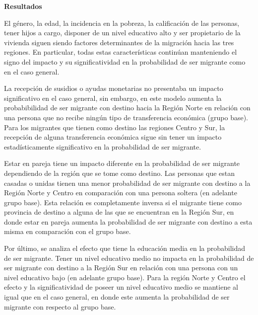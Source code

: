\documentclass[12pt,a4paper]{article}
\begin{document}
\textbf{Resultados}

El género, la edad, la incidencia en la pobreza, la calificación de las personas, tener hijos a cargo, disponer de un nivel educativo alto y ser propietario de la vivienda siguen siendo factores determinantes de la migración hacia las tres regiones. En particular, todas estas características continúan  manteniendo el signo del impacto y su significatividad en la probabilidad de ser migrante como en el caso general. 

La recepción de susidios o ayudas monetarias no presentaba un impacto significativo en el caso general, sin embargo, en este modelo aumenta la probabibilidad de ser migrante con destino hacia la Región Norte en relación con una persona que no recibe ningún tipo de transferencia económica (grupo base). Para los migrantes que tienen como destino las regiones Centro y Sur, la recepción de alguna transferencia económica  sigue sin tener un impacto estadísticamente significativo en la probabilidad de ser migrante.

Estar en pareja tiene un impacto diferente en la probabilidad de ser migrante dependiendo de la región que se tome como destino. Las personas que estan casadas o unidas tienen una menor probabilidad de ser migrante con destino a la Región Norte y Centro en comparación con una persona soltera (en adelante grupo base). Esta relación es completamente inversa si el migrante tiene como provincia de destino a alguna de las que se encuentran en la Región Sur, en donde estar en pareja aumenta la probabilidad de ser migrante con destino a esta misma en comparación con el grupo base.


Por último, se analiza el efecto que tiene la educación media en la probabilidad de ser migrante. Tener un nivel educativo medio no impacta en la probabilidad de ser migrante con destino a la Región Sur en relación con una persona con un nivel educativo bajo (en adelante grupo base). Para la región Norte y Centro el efecto y la significatividad de poseer un nivel educativo medio se mantiene al igual que en el caso general, en donde este aumenta la probabilidad de ser migrante con respecto al grupo base.
\end{document}
